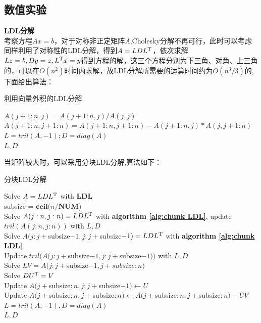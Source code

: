 \documentclass[12pt]{ctexart}
\begin{document}
\subsection{数值实验}
\noindent \textbf{LDL分解}\\
考察方程$Ax=b$，对于对称非正定矩阵$A$,Cholesky分解不再可行，此时可以考虑同样利用了对称性的LDL分解，得到$A=LDL^{\rm T}$，依次求解$Lz=b,Dy=z,L^{\rm T} x=y$得到方程的解，这三个方程分别为下三角、对角、上三角的，可以在$O(n^2)$时间内求解，故LDL分解所需要的运算时间约为$O(n^3/3)$的,下面给出算法：\\
\begin{algorithm}[H]
	\caption{利用向量外积的LDL分解}  
	\label{alg:gaxpy ldl}
	{ 
		$A(j+1:n,j) = A(j+1:n,j)/A(j,j)$\\
		$A(j+1:n,j+1:n) = A(j+1:n,j+1:n)-A(j+1:n,j)*A(j,j+1:n)$\\	
	}  
	$L = tril(A,-1); D = diag(A)$\\
	\Return $L,D$\;
\end{algorithm}
当矩阵较大时，可以采用分块LDL分解,算法如下：\\
\begin{algorithm}[H]
	\caption{分块LDL分解}  
	\label{alg:chunk LDL}
	{
			Solve $A=LDL^{\rm T}$ with  \textbf{LDL}\\
	}  
	subsize = $\textbf{ceil}(n/\textbf{NUM}$)\\
	{ 
		{
			Solve $ A(j:n,j:n) = LDL^{\rm T} $ with \textbf{algorithm \ref{alg:chunk LDL}}, update $ tril(A(j:n,j:n))$ with $ L,D$\\
		}
		\Else
		{
			Solve $A(j:j+$subsize$-1,j:j+$subsize$-1) = LDL^{\rm T}$ with \textbf{algorithm \ref{alg:chunk LDL}}\\
			Update $tril(A(j:j+$subsize$-1,j:j+$subsize$-1)) $ with $ L,D$\\
			Solve $ LV= A(j:j+$subsize$-1,j+subsize:n) $\\
			Solve $ DU^{\rm T} = V $\\
			Update $A(j+$subsize$:n,j:j+$subsize$-1)\gets U $\\
			Update $A(j+$subsize$:n,j+$subsize$:n)\gets A(j+$subsize$:n,j+$subsize$:n)-UV$\\						
		}	
	} 
 	$L = tril(A,-1),D=diag(A)$\\
	\Return $L,D$\;
\end{algorithm}
\end{document}
